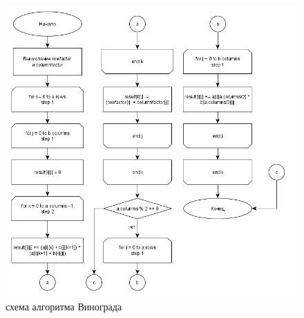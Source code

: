 \documentclass[a4paper, 14pt]{article}
\begin{document}
	\vspace{1cm}
	
	\begin{figure}[H]
		\centering
		\includegraphics[scale=0.5]{Схемы/vinograd}
		\caption{схема алгоритма Винограда}
		\label{fig:vinograd}
	\end{figure}
	
\end{document}
